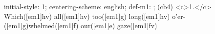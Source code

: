 initial-style: 1;
centering-scheme: english;
def-m1: \grealign;
(cb4) <c>1.</c> Which([em1]hv) all([em1]hv) too([em1]g) long([em1]hv) o'er-([em1]g)whelmed([em1]f) our([em1]e) gaze([em1]fv)
